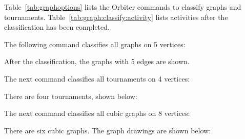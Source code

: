 

Table~\ref{tab:graphoptions} lists the Orbiter commands to classify graphs and tournaments. 
Table~\ref{tab:graph:classify:activity} 
lists activities after the classification has been completed. 


The following command classifies all graphs on 5 vertices:


After the classification, the graphs with 5 edges are shown. 


\bigskip


The next command classifies all tournaments on 4 vertices:


There are four tournaments, shown below:


\bigskip

The next command classifies all cubic graphs on 8 vertices:


There are six cubic graphs. 
The graph drawings are shown below:




